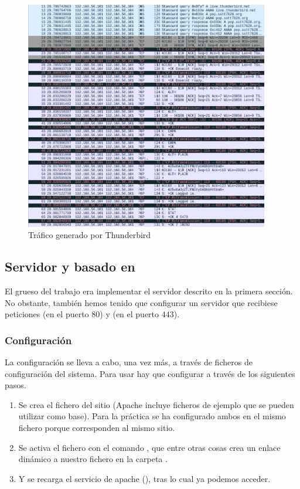 \begin{figure}[h]
    \centering
    \includegraphics[width=0.95\textwidth]{tests/capture-mail.png}
    \caption{Tráfico generado por Thunderbird}
    \label{img-cap-mail}
\end{figure}

\subsection{Servidor {\HTTP} y {\HTTPs} basado en }
El grueso del trabajo era implementar el servidor {\HTTP} descrito en la primera sección. No obstante, también hemos tenido que configurar un servidor  que recibiese peticiones {\HTTP} (en el puerto $80$) y {\HTTPs} (en el puerto $443$).

\subsubsection{Configuración}
La configuración se lleva a cabo, una vez más, a través de ficheros de configuración del sistema. Para usar  hay que configurar  a través de los siguientes pasos.

\begin{enumerate}
\item Se crea el fichero del sitio  (Apache incluye ficheros de ejemplo que se pueden utilizar como base). Para la práctica se ha configurado ambos  en el mismo fichero porque corresponden al mismo sitio.
\item Se activa el fichero con el comando , que entre otras cosas crea un enlace dinámico a nuestro fichero en la carpeta .
\item Y se recarga el servicio de apache (), tras lo cual ya podemos acceder.
\end{enumerate}

